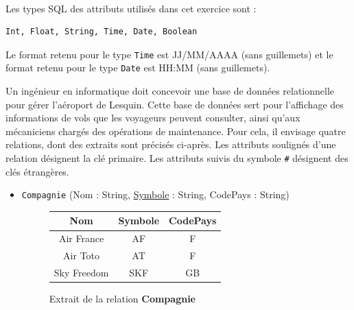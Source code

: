 \documentclass[11pt,a4paper,french,twoside]{PMCours}
\begin{document}
\ \\
Les types SQL des attributs utilisés dans cet exercice sont : 
\begin{verbatim}
Int, Float, String, Time, Date, Boolean
\end{verbatim} 
Le format retenu pour le type \verb'Time' est JJ/MM/AAAA (sans guillemets) et 
le format retenu pour le type \verb'Date' est HH:MM (sans guillemets).

\medskip
Un ingénieur en informatique doit concevoir une base de données relationnelle pour gérer l'aéroport de Lesquin. Cette base de données sert pour l'affichage des informations de vols que les voyageurs peuvent consulter, ainsi qu'aux mécaniciens chargés des opérations de maintenance. Pour cela, il envisage quatre relations, dont des extraits sont précisés ci-après. Les attributs soulignés d'une relation désignent la clé primaire. Les attributs suivis du symbole \verb'#' désignent des clés étrangères.

\begin{itemize}
\item \verb'Compagnie' (Nom : String, \underline{Symbole} : String, CodePays : String)
\begin{figure}[ht]
\begin{center}
\begin{tabular}{|c|c|c|}\hline
Nom & Symbole & CodePays\\\hline
Air France & AF & F\\\hline
Air Toto & AT & F\\\hline
Sky Freedom & SKF & GB\\\hline
\end{tabular}
\end{center}
\caption{Extrait de la relation \textbf{Compagnie}}
\end{figure}
\end{itemize}
\end{document}
